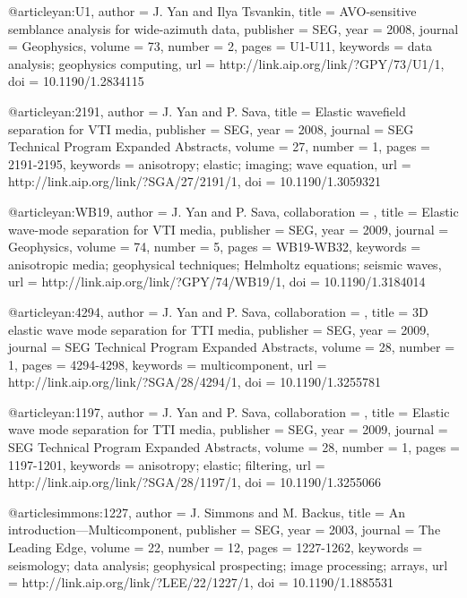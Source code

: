 {@article{yan:U1,
  author =	 {J. Yan and Ilya Tsvankin},
  title =	 {AVO-sensitive semblance analysis for wide-azimuth
                  data},
  publisher =	 {SEG},
  year =	 2008,
  journal =	 {Geophysics},
  volume =	 73,
  number =	 2,
  pages =	 {U1-U11},
  keywords =	 {data analysis; geophysics computing},
  url =		 {http://link.aip.org/link/?GPY/73/U1/1},
  doi =		 {10.1190/1.2834115}
}

@article{yan:2191,
  author =	 {J. Yan and P. Sava},
  title =	 {Elastic wavefield separation for {VTI} media},
  publisher =	 {SEG},
  year =	 2008,
  journal =	 {SEG Technical Program Expanded Abstracts},
  volume =	 27,
  number =	 1,
  pages =	 {2191-2195},
  keywords =	 {anisotropy; elastic; imaging; wave equation},
  url =		 {http://link.aip.org/link/?SGA/27/2191/1},
  doi =		 {10.1190/1.3059321}
}




@article{yan:WB19,
author = {J. Yan and P. Sava},
collaboration = {},
title = {Elastic wave-mode separation for {VTI} media},
publisher = {SEG},
year = {2009},
journal = {Geophysics},
volume = {74},
number = {5},
pages = {WB19-WB32},
keywords = {anisotropic media; geophysical techniques; Helmholtz equations; seismic waves},
url = {http://link.aip.org/link/?GPY/74/WB19/1},
doi = {10.1190/1.3184014}
}




@article{yan:4294,
author = {J. Yan and P. Sava},
collaboration = {},
title = {3{D} elastic wave mode separation for {TTI} media},
publisher = {SEG},
year = {2009},
journal = {SEG Technical Program Expanded Abstracts},
volume = {28},
number = {1},
pages = {4294-4298},
keywords = {multicomponent},
url = {http://link.aip.org/link/?SGA/28/4294/1},
doi = {10.1190/1.3255781}
}







@article{yan:1197,
author = {J. Yan and P. Sava},
collaboration = {},
title = {Elastic wave mode separation for {TTI} media},
publisher = {SEG},
year = {2009},
journal = {SEG Technical Program Expanded Abstracts},
volume = {28},
number = {1},
pages = {1197-1201},
keywords = {anisotropy; elastic; filtering},
url = {http://link.aip.org/link/?SGA/28/1197/1},
doi = {10.1190/1.3255066}
}






@article{simmons:1227,
  author =	 {J. Simmons and M. Backus},
  title =	 {An introduction---{M}ulticomponent},
  publisher =	 {SEG},
  year =	 2003,
  journal =	 {The Leading Edge},
  volume =	 22,
  number =	 12,
  pages =	 {1227-1262},
  keywords =	 {seismology; data analysis; geophysical prospecting;
                  image processing; arrays},
  url =		 {http://link.aip.org/link/?LEE/22/1227/1},
  doi =		 {10.1190/1.1885531}
}

}

